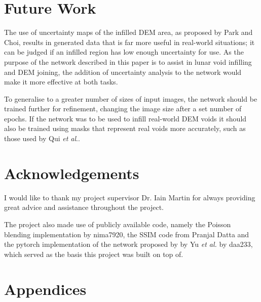 \documentclass[twocolumn]{article}
\begin{document}
\section{Future Work}
\label{sec:org8aedaee}

The use of uncertainty maps of the infilled DEM area, as proposed by Park and Choi\autocite{parkNeuralProcessApproach2021}, results in generated data that is far more useful in real-world situations; it can be judged if an infilled region has low enough uncertainty for use.
As the purpose of the network described in this paper is to assist in lunar void infilling and DEM joining, the addition of uncertainty analysis to the network would make it more effective at both tasks.

To generalise to a greater number of sizes of input images, the network should be trained further for refinement, changing the image size after a set number of epochs. If the network was to be used to infill real-world DEM voids it should also be trained using masks that represent real voids more accurately, such as those used by Qui \emph{et al}.\autocite{qiuVoidFillingDigital2019}.

\section*{Acknowledgements}

I would like to thank my project supervisor Dr. Iain Martin for always providing great advice and assistance throughout the project.

The project also made use of publicly available code, namely the Poisson blending implementation by nima7920\autocite{nima7920Nima7920Imageblending2023}, the SSIM code from Pranjal Datta\autocite{dattaSSIMPyTorch2023} and the pytorch implementation of the network proposed by by Yu \emph{et al.}\autocite{yuGenerativeImageInpainting2018} by daa233\autocite{Daa233GenerativeinpaintingpytorchPyTorch}, which served as the basis this project was built on top of.

\printbibliography


\section*{Appendices}
\end{document}
